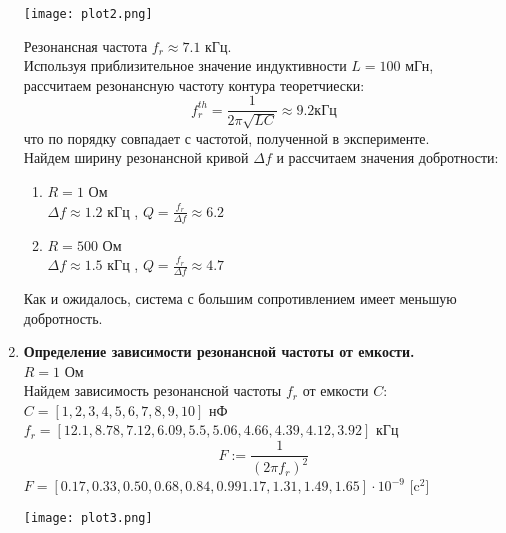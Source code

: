 \documentclass[10pt]{article}
\begin{document}
\begin{enumerate}
        \begin{center}
        \texttt{[image: plot2.png]}
        \end{center}

        Резонансная частота $f_r \approx 7.1$ кГц. \\
        Используя приблизительное значение индуктивности $L = 100$ мГн, рассчитаем резонансную частоту контура теоретчиески:
        \begin{equation}
            f^{th}_{r} = \frac{1}{2 \pi \sqrt{LC}} \approx 9.2 \text{кГц}
        \end{equation} 
        что по порядку совпадает с частотой, полученной в эксперименте. \\
        Найдем ширину резонансной кривой $\Delta f$ и рассчитаем значения добротности: 
        \begin{enumerate}
        \item $R = 1$ Ом \\
            $\Delta f \approx 1.2$ кГц , $Q = \frac{f_r}{\Delta f} \approx 6.2$
        \item $R = 500$ Ом \\
            $\Delta f \approx 1.5$ кГц , $Q = \frac{f_r}{\Delta f} \approx 4.7$
        \end{enumerate}
        Как и ожидалось, система с большим сопротивлением имеет меньшую добротность.
        
    \item \textbf{Определение зависимости резонансной частоты от емкости.} \\
        $R = 1$ Ом \\
        Найдем зависимость резонансной частоты $f_r$ от емкости $C$: \\
        $C = [1,  2,  3 , 4 , 5 , 6 , 7 , 8 , 9 ,10]$ нФ \\
        $f_r = [12.1, 8.78, 7.12, 6.09, 5.5, 5.06, 4.66, 4.39, 4.12, 3.92]$ кГц \\
        \begin{equation} 
            F := \frac{1}{(2 \pi f_r)^2}
        \end{equation}
        $F = [ 0.17 , 0.33 , 0.50 , 0.68 , 0.84 , 0.99 1.17 , 1.31 , 1.49 , 1.65] \cdot 10 ^{-9}$ [$\text{c}^2$] 
        \begin{center}
        \texttt{[image: plot3.png]}
        \end{center}


\end{enumerate}
\end{document}
